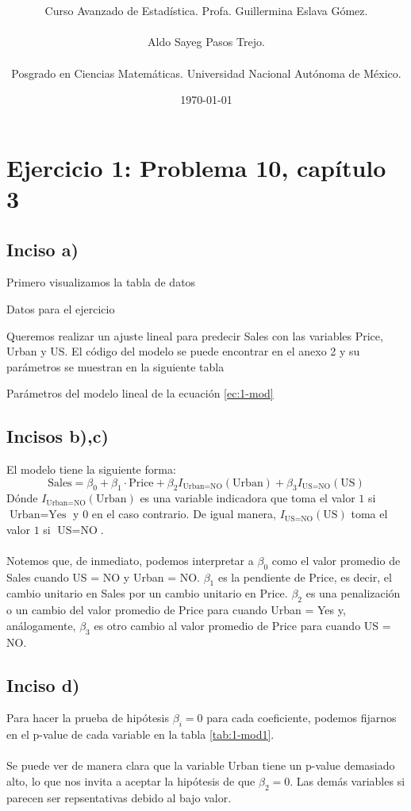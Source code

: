 \documentclass[11pt]{article}
\title{\textbf{\work}}
\author{Curso Avanzado de Estadística. Profa. Guillermina Eslava Gómez.\\ \\ Aldo Sayeg Pasos Trejo. \\ \\ Posgrado en Ciencias Matemáticas. Universidad Nacional Autónoma de México. }
\date{\today}
\begin{document}
\maketitle
\section{Ejercicio 1: Problema 10, capítulo 3 \cite{isl}}
\subsection{Inciso a)}
Primero visualizamos la tabla de datos
\begin{table}[H]
    \centering
    
    \caption{Datos para el ejercicio}
\end{table}
Queremos realizar un ajuste lineal para predecir Sales con las variables Price, Urban y US. El código del modelo se puede encontrar en el anexo 2 y su parámetros se muestran en la siguiente tabla
\begin{table}[H]
    \centering
    
    \caption{Parámetros del modelo lineal de la ecuación \ref{ec:1-mod}}
    \label{tab:1-mod1}
\end{table}
\subsection{Incisos b),c)}
El modelo tiene la siguiente forma:
\begin{equation}
    \text{Sales} = \beta_0 + \beta_{1} \cdot \text{Price} + \beta_{2} I_{\text{Urban}= \text{NO}}(\text{Urban}) + \beta_{3} I_{\text{US}= \text{NO}}(\text{US})
\end{equation}
Dónde $I_{\text{Urban}= \text{NO}}(\text{Urban})$ es una variable indicadora que toma el valor $1$ si $\text{Urban} = \text{Yes}$ y $0$ en el caso contrario. De igual manera, $I_{\text{US}= \text{NO}}(\text{US})$ toma el valor $1$ si $\text{US}= \text{NO}$. 
\\
\\Notemos que, de inmediato, podemos interpretar a $\beta_0$ como el valor promedio de Sales cuando US = NO y Urban = NO. $\beta_1$ es la pendiente de Price, es decir, el cambio unitario en Sales por un cambio unitario en Price. $\beta_2$ es una penalización o un cambio del valor promedio de Price para cuando Urban = Yes y, análogamente, $\beta_3$ es otro cambio al valor promedio de Price para cuando US = NO.
\subsection{Inciso d)}
Para hacer la prueba de hipótesis $\beta_i = 0$ para cada coeficiente, podemos fijarnos en el p-value de cada variable en la tabla \ref{tab:1-mod1}.
\\
\\Se puede ver de manera clara que la variable Urban tiene un p-value demasiado alto, lo que nos invita a aceptar la hipótesis de que $\beta_2 = 0$. Las demás variables si parecen ser repsentativas debido al bajo valor.
\end{document}
